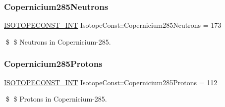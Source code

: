 \subsubsection{\texorpdfstring{Copernicium285\+Neutrons}{Copernicium285Neutrons}}
{\footnotesize\ttfamily \mbox{\hyperlink{group___isotope_const-_macros_ga5f18360b3e99483a35c32d789e62621c}{I\+S\+O\+T\+O\+P\+E\+C\+O\+N\+S\+T\+\_\+\+I\+NT}} Isotope\+Const\+::\+Copernicium285\+Neutrons = 173}

\$ \$ Neutrons in Copernicium-\/285. \mbox{\label{group___isotope_const-_copernicium-_cn285_ga0994c9ec52e2c382c4272c26f6524f5e}} 
\subsubsection{\texorpdfstring{Copernicium285\+Protons}{Copernicium285Protons}}
{\footnotesize\ttfamily \mbox{\hyperlink{group___isotope_const-_macros_ga5f18360b3e99483a35c32d789e62621c}{I\+S\+O\+T\+O\+P\+E\+C\+O\+N\+S\+T\+\_\+\+I\+NT}} Isotope\+Const\+::\+Copernicium285\+Protons = 112}

\$ \$ Protons in Copernicium-\/285. 